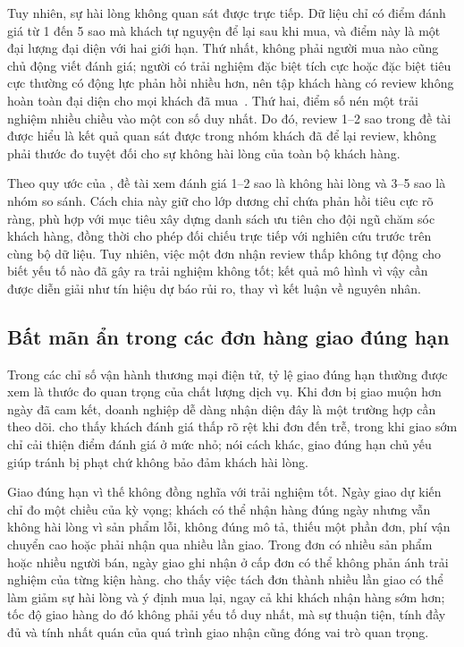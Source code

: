 Tuy nhiên, sự hài lòng không quan sát được trực tiếp. Dữ liệu chỉ có điểm đánh giá từ 1 đến 5 sao mà khách tự nguyện để lại sau khi mua, và điểm này là một đại lượng đại diện với hai giới hạn. Thứ nhất, không phải người mua nào cũng chủ động viết đánh giá; người có trải nghiệm đặc biệt tích cực hoặc đặc biệt tiêu cực thường có động lực phản hồi nhiều hơn, nên tập khách hàng có review không hoàn toàn đại diện cho mọi khách đã mua~\parencite{li2008,schoenmueller2020}. Thứ hai, điểm số nén một trải nghiệm nhiều chiều vào một con số duy nhất. Do đó, review 1--2 sao trong đề tài được hiểu là kết quả quan sát được trong nhóm khách đã để lại review, không phải thước đo tuyệt đối cho sự không hài lòng của toàn bộ khách hàng.

Theo quy ước của \textcite{orman2026}, đề tài xem đánh giá 1--2 sao là không hài lòng và 3--5 sao là nhóm so sánh. Cách chia này giữ cho lớp dương chỉ chứa phản hồi tiêu cực rõ ràng, phù hợp với mục tiêu xây dựng danh sách ưu tiên cho đội ngũ chăm sóc khách hàng, đồng thời cho phép đối chiếu trực tiếp với nghiên cứu trước trên cùng bộ dữ liệu. Tuy nhiên, việc một đơn nhận review thấp không tự động cho biết yếu tố nào đã gây ra trải nghiệm không tốt; kết quả mô hình vì vậy cần được diễn giải như tín hiệu dự báo rủi ro, thay vì kết luận về nguyên nhân.

\subsection{Bất mãn ẩn trong các đơn hàng giao đúng hạn}\label{sec:con-hidden}

Trong các chỉ số vận hành thương mại điện tử, tỷ lệ giao đúng hạn thường được xem là thước đo quan trọng của chất lượng dịch vụ. Khi đơn bị giao muộn hơn ngày đã cam kết, doanh nghiệp dễ dàng nhận diện đây là một trường hợp cần theo dõi. \textcite{ravula2023} cho thấy khách đánh giá thấp rõ rệt khi đơn đến trễ, trong khi giao sớm chỉ cải thiện điểm đánh giá ở mức nhỏ; nói cách khác, giao đúng hạn chủ yếu giúp tránh bị phạt chứ không bảo đảm khách hài lòng.

Giao đúng hạn vì thế không đồng nghĩa với trải nghiệm tốt. Ngày giao dự kiến chỉ đo một chiều của kỳ vọng; khách có thể nhận hàng đúng ngày nhưng vẫn không hài lòng vì sản phẩm lỗi, không đúng mô tả, thiếu một phần đơn, phí vận chuyển cao hoặc phải nhận qua nhiều lần giao. Trong đơn có nhiều sản phẩm hoặc nhiều người bán, ngày giao ghi nhận ở cấp đơn có thể không phản ánh trải nghiệm của từng kiện hàng. \textcite{brylla2022} cho thấy việc tách đơn thành nhiều lần giao có thể làm giảm sự hài lòng và ý định mua lại, ngay cả khi khách nhận hàng sớm hơn; tốc độ giao hàng do đó không phải yếu tố duy nhất, mà sự thuận tiện, tính đầy đủ và tính nhất quán của quá trình giao nhận cũng đóng vai trò quan trọng.

